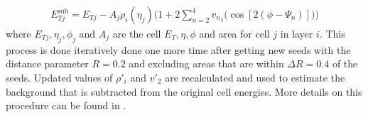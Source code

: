 \begin{align}
E_{Tj}^{\mathrm{sub}} = E_{Tj} - A_j \rho_i (\eta_j) \Big(1+2 \sum_{n=2}^{4} {v_{n}}_i \big(\cos[2(\phi-\Psi_n)] \big) \Big)
\end{align}
where $E_{Tj} , \eta_j, \phi_j$ and $A_j$ are the cell $E_T, \eta, \phi$ and area for cell $j$ in layer $i$.
This process is done iteratively done one more time after getting new seeds with the distance parameter $R = 0.2$ and excluding areas that are within $\Delta R = 0.4$ of the seeds.
Updated values of $\rho{'}_i$ and $v{'}_2$ are recalculated and used to estimate the background that is subtracted from the original cell energies.
More details on this procedure can be found in \cite{2013220}.



%
%
%
%
%
%
%
%
%
%
%
%
%
%
%
%
%
%
%
%
